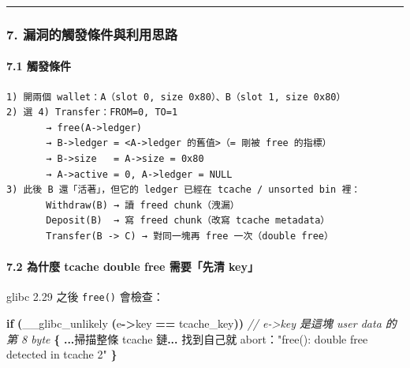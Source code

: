 \documentclass[10pt,a4paper]{article}
\newenvironment{Shaded}{\begin{snugshade}}{\end{snugshade}}
\newcommand{\CommentTok}[1]{\textcolor[rgb]{0.56,0.35,0.01}{\textit{#1}}}
\newcommand{\ControlFlowTok}[1]{\textcolor[rgb]{0.13,0.29,0.53}{\textbf{#1}}}
\newcommand{\NormalTok}[1]{#1}
\newcommand{\OperatorTok}[1]{\textcolor[rgb]{0.81,0.36,0.00}{\textbf{#1}}}
\newcommand{\StringTok}[1]{\textcolor[rgb]{0.31,0.60,0.02}{#1}}
\renewenvironment{Shaded}{%
  \def\FrameCommand{\fboxsep=3.2pt\colorbox{shadecolor}}%
  \MakeFramed{\advance\hsize-\width\FrameRestore\small}%
}{%
  \endMakeFramed
}
\begin{document}
\begin{center}\rule{0.5\linewidth}{0.5pt}\end{center}

\subsubsection{7.
漏洞的觸發條件與利用思路}\label{ux6f0fux6d1eux7684ux89f8ux767cux689dux4ef6ux8207ux5229ux7528ux601dux8def}

\paragraph{7.1 觸發條件}\label{ux89f8ux767cux689dux4ef6}

\begin{Verbatim}[breaklines=true,breakanywhere=true,breakautoindent=false,fontsize=\fontsize{7.0}{9.5}\selectfont]
1) 開兩個 wallet：A（slot 0, size 0x80）、B（slot 1, size 0x80）
2) 選 4) Transfer：FROM=0, TO=1
       → free(A->ledger)
       → B->ledger = <A->ledger 的舊值>（= 剛被 free 的指標）
       → B->size   = A->size = 0x80
       → A->active = 0, A->ledger = NULL
3) 此後 B 還「活著」，但它的 ledger 已經在 tcache / unsorted bin 裡：
       Withdraw(B) → 讀 freed chunk（洩漏）
       Deposit(B)  → 寫 freed chunk（改寫 tcache metadata）
       Transfer(B -> C) → 對同一塊再 free 一次（double free）
\end{Verbatim}

\paragraph{7.2 為什麼 tcache double free 需要「先清
key」}\label{ux70baux4ec0ux9ebc-tcache-double-free-ux9700ux8981ux5148ux6e05-key}

glibc 2.29 之後 \texttt{free()} 會檢查：

\begin{Shaded}
\begin{Highlighting}[]
\ControlFlowTok{if} \OperatorTok{(}\NormalTok{\_\_glibc\_unlikely }\OperatorTok{(}\NormalTok{e}\OperatorTok{{-}\textgreater{}}\NormalTok{key }\OperatorTok{==}\NormalTok{ tcache\_key}\OperatorTok{))}   \CommentTok{// e{-}\textgreater{}key 是這塊 user data 的第 8 byte}
    \OperatorTok{\{} \OperatorTok{...}\NormalTok{掃描整條 tcache 鏈}\OperatorTok{...}\NormalTok{ 找到自己就 abort：}\StringTok{"free(): double free detected in tcache 2"} \OperatorTok{\}}
\end{Highlighting}
\end{Shaded}
\end{document}

